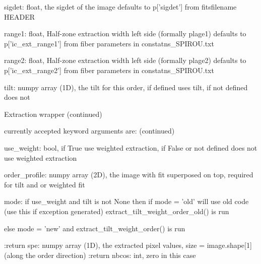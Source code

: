 \begin{minipage}{\textwidth}
\begin{pythondocstring}
    sigdet:         float, the sigdet of the image
                    defaults to p['sigdet'] from fitsfilename HEADER

    range1:         float, Half-zone extraction width left side
                    (formally plage1)
                    defaults to p['ic_ext_range1'] from fiber parameters in
                    constatns_SPIROU.txt

    range2:         float, Half-zone extraction width left side
                    (formally plage2)
                    defaults to p['ic_ext_range2'] from fiber parameters in
                    constatns_SPIROU.txt

    tilt:           numpy array (1D), the tilt for this order, if defined
                    uses tilt, if not defined does not
\end{pythondocstring}
\end{minipage}

\begin{minipage}{\textwidth}
\begin{pythondocstring}
Extraction wrapper (continued)

currently accepted keyword arguments are: (continued)

    use_weight:    bool, if True use weighted extraction, if False or not
                    defined does not use weighted extraction

    order_profile:  numpy array (2D), the image with fit superposed on top,
                    required for tilt and or weighted fit

    mode:           if use_weight and tilt is not None then
                    if mode = 'old'  will use old code (use this if
                    exception generated)
                    extract_tilt_weight_order_old() is run

                    else mode = 'new' and
                    extract_tilt_weight_order() is run

:return spe: numpy array (1D), the extracted pixel values,
             size = image.shape[1] (along the order direction)
:return nbcos: int, zero in this case
\end{pythondocstring}
\end{minipage}

